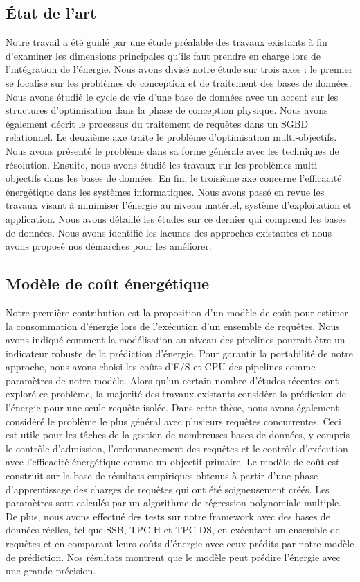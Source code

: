 \subsection{État de l'art}
Notre travail a été guidé par une étude préalable des travaux existants à fin d'examiner les dimensions principales qu'ils faut prendre en charge lors de l'intégration de l'énergie. Nous avons divisé notre étude sur trois axes : le premier se focalise sur les problèmes de conception et de traitement des bases de données. Nous avons étudié le cycle de vie d'une base de données avec un accent sur les structures d'optimisation dans la phase de conception physique. Nous avons également décrit le processus du traitement de requêtes dans un SGBD relationnel. Le deuxième axe traite le problème d'optimisation multi-objectifs. Nous avons présenté le problème dans sa forme générale avec les techniques de résolution. Ensuite, nous avons étudié les travaux sur les problèmes multi-objectifs dans les bases de données. En fin, le troisième axe concerne l'efficacité énergétique dans les systèmes informatiques. Nous avons passé en revue les travaux visant à minimiser l'énergie au niveau matériel, système d'exploitation et application. Nous avons détaillé les études sur ce dernier qui comprend les bases de données. Nous avons identifié les lacunes des approches existantes et nous avons proposé nos démarches pour les améliorer.
 
\subsection{Modèle de coût énergétique}
Notre première contribution est la proposition d'un modèle de coût pour estimer la consommation d'énergie lors de l'exécution d'un ensemble de requêtes. Nous avons indiqué comment la modélisation au niveau des pipelines pourrait être un indicateur robuste de la prédiction d'énergie. Pour garantir la portabilité de notre approche, nous avons choisi les coûts d'E/S et CPU des pipelines comme paramètres de notre modèle. Alors qu'un certain nombre d'études récentes ont exploré ce problème, la majorité des travaux existants considère la prédiction de l'énergie pour une seule requête isolée. Dans cette thèse, nous avons également considéré le problème le plus général avec plusieurs requêtes concurrentes. Ceci est utile pour les tâches de la gestion de nombreuses bases de données, y compris le contrôle d'admission, l'ordonnancement des requêtes et le contrôle d'exécution avec l'efficacité énergétique comme un objectif primaire.
Le modèle de coût est construit sur la base de résultats empiriques obtenus à partir d'une phase d'apprentissage des charges de requêtes qui ont été soigneusement créés. Les paramètres sont calculés par un algorithme de régression polynomiale multiple. De plus, nous avons effectué des tests sur notre framework avec des bases de données réelles, tel que SSB, TPC-H et TPC-DS, en exécutant un ensemble de requêtes et en comparant leurs coûts d'énergie avec ceux prédits par notre modèle de prédiction. Nos résultats montrent que le modèle peut prédire l'énergie avec une grande précision.

